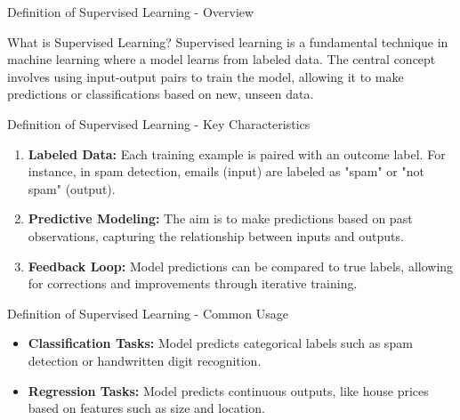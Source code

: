 \documentclass[aspectratio=169]{beamer}
\begin{document}
\begin{frame}[fragile]{Definition of Supervised Learning - Overview}
    \begin{block}{What is Supervised Learning?}
        Supervised learning is a fundamental technique in machine learning where a model learns from labeled data. The central concept involves using input-output pairs to train the model, allowing it to make predictions or classifications based on new, unseen data.
    \end{block}
\end{frame}

\begin{frame}[fragile]{Definition of Supervised Learning - Key Characteristics}
    \begin{enumerate}
        \item \textbf{Labeled Data:} Each training example is paired with an outcome label. For instance, in spam detection, emails (input) are labeled as "spam" or "not spam" (output).
        \item \textbf{Predictive Modeling:} The aim is to make predictions based on past observations, capturing the relationship between inputs and outputs.
        \item \textbf{Feedback Loop:} Model predictions can be compared to true labels, allowing for corrections and improvements through iterative training.
    \end{enumerate}
\end{frame}

\begin{frame}[fragile]{Definition of Supervised Learning - Common Usage}
    \begin{itemize}
        \item \textbf{Classification Tasks:} Model predicts categorical labels such as spam detection or handwritten digit recognition.
        \item \textbf{Regression Tasks:} Model predicts continuous outputs, like house prices based on features such as size and location.
    \end{itemize}
\end{frame}
\end{document}
